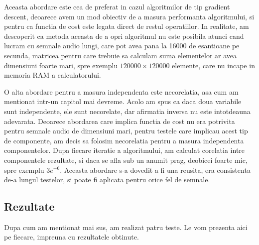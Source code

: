\documentclass[12pt,oneside]{article}
\begin{document}
Aceasta abordare este cea de preferat in cazul algoritmilor de tip gradient descent, deoarece avem un mod obiectiv de a masura performanta algoritmului, si pentru ca functia de cost este legata direct de restul operatiilor. In realitate, am descoperit ca metoda aceasta de a opri algoritmul nu este posibila atunci cand lucram cu semnale audio lungi, care pot avea pana la 16000 de esantioane pe secunda, matricea pentru care trebuie sa calculam suma elementelor ar avea dimensiuni foarte mari, spre exemplu $120000 \times 120000$ elemente, care nu incape in memoria RAM a calculatorului. 

O alta abordare pentru a masura independenta este necorelatia, asa cum am mentionat intr-un capitol mai devreme. Acolo am spus ca daca doua variabile sunt independente, ele sunt necorelate, dar afirmatia inversa nu este intotdeauna adevarata. Deoarece abordarea care implica functia de cost nu era potrivita pentru semnale audio de dimensiuni mari, pentru testele care implicau acest tip de componente, am decis sa folosim necorelatia pentru a masura independenta componentelor. Dupa fiecare iteratie a algoritmului, am calculat corelatia intre componentele rezultate, si daca se afla sub un anumit prag, deobicei foarte mic, spre exemplu $3e^{-6}$. Aceasta abordare s-a dovedit a fi una reusita, era consistenta de-a lungul testelor, si poate fi aplicata pentru orice fel de semnale. 

\newpage
\subsection{Rezultate}
Dupa cum am mentionat mai sus, am realizat patru teste. Le vom prezenta aici pe fiecare, impreuna cu rezultatele obtinute.
\end{document}

